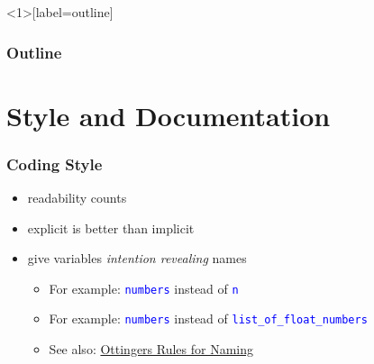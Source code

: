 \documentclass{beamer}
\begin{document}

\begin{frame}<1>[label=outline]
 \frametitle{Outline}

  
\end{frame}


\section{Style and Documentation}


\begin{frame}
 \frametitle{Coding Style}

\begin{itemize}
  \item readability counts
  \item explicit is better than implicit
\end{itemize}

\begin{itemize}
  \item give variables \emph{intention revealing} names
\begin{itemize}
  \item For example: \textcolor{blue}{\texttt{numbers}} instead of \textcolor{blue}{\texttt{n}}
  \item For example: \textcolor{blue}{\texttt{numbers}} instead of \textcolor{blue}{\texttt{list\_of\_float\_numbers}}
  \item See also: \href{http://objectmentor.com/resources/articles/naming.htm}{Ottingers Rules for Naming}
\end{itemize}
\end{itemize}

\vspace{0.5cm}

\begin{example}
\end{example}

\end{frame}

\end{document}
